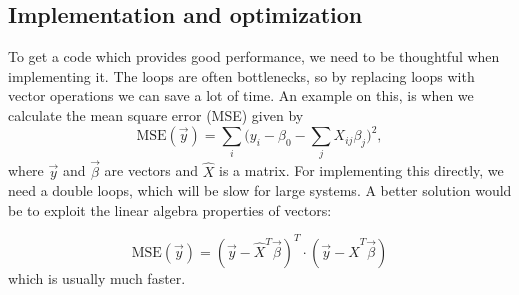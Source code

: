 \subsection{Implementation and optimization} \label{sec:implementation}
To get a code which provides good performance, we need to be thoughtful when implementing it. The loops are often bottlenecks, so by replacing loops with vector operations we can save a lot of time. An example on this, is when we calculate the mean square error (MSE) given by
\begin{equation}
\text{MSE}(\vec{y})=\sum_i\bigg(y_i-\beta_0-\sum_jX_{ij}\beta_j\bigg)^2,
\end{equation}
where $\vec{y}$ and $\vec{\beta}$ are vectors and $\hat{X}$ is a matrix. For implementing this directly, we need a double loops, which will be slow for large systems. A better solution would be to exploit the linear algebra properties of vectors:

\begin{equation}
\text{MSE}(\vec{y})=(\vec{y}-\hat{X}^T\vec{\beta})^T\cdot(\vec{y}-\hat{X}^T\vec{\beta})
\end{equation}
which is usually much faster. 